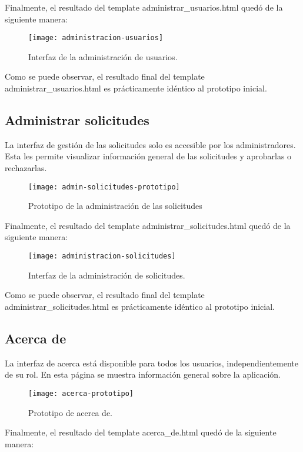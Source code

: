 Finalmente, el resultado del template administrar\_usuarios.html quedó de la siguiente manera:

\begin{figure}[htb]
\centering
\texttt{[image: administracion-usuarios]}
\caption{Interfaz de la administración de usuarios.}
\label{fig:administracion-usuarios}
\end{figure}

Como se puede observar, el resultado final del template administrar\_usuarios.html es prácticamente idéntico al prototipo inicial. 

\subsection{Administrar solicitudes}
La interfaz de gestión de las solicitudes solo es accesible por los administradores. Esta les permite visualizar información general de las solicitudes y aprobarlas o rechazarlas.

\begin{figure}[htb]
\centering
\texttt{[image: admin-solicitudes-prototipo]}
\caption{Prototipo de la administración de las solicitudes}
\label{fig:admin-solicitudes-prototipo}
\end{figure}
Finalmente, el resultado del template administrar\_solicitudes.html quedó de la siguiente manera:

\begin{figure}[htb]
\centering
\texttt{[image: administracion-solicitudes]}
\caption{Interfaz de la administración de solicitudes.}
\label{fig:administracion-solicitudes}
\end{figure}

Como se puede observar, el resultado final del template administrar\_solicitudes.html es prácticamente idéntico al prototipo inicial. 

\subsection{Acerca de}
La interfaz de acerca está disponible para todos los usuarios, independientemente de su rol. En esta página se muestra información general sobre la aplicación.

\begin{figure}[htb]
\centering
\texttt{[image: acerca-prototipo]}
\caption{Prototipo de acerca de.}
\label{fig:acerca-prototipo}
\end{figure}
Finalmente, el resultado del template acerca\_de.html quedó de la siguiente manera:

